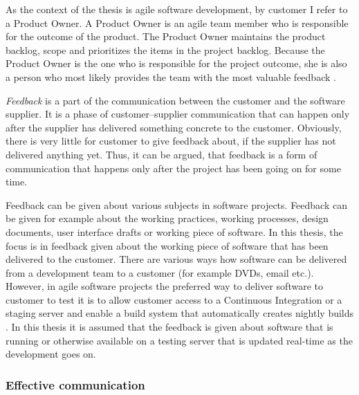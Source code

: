 \documentclass[english,12pt,a4paper,pdftex]{article}
\begin{document}
As the context of the thesis is agile software development, by customer I refer to a Product Owner. A Product Owner is an agile team member who is responsible for the outcome of the product. The Product Owner maintains the product backlog, scope and prioritizes the items in the project backlog. Because the Product Owner is the one who is responsible for the project outcome, she is also a person who most likely provides the team with the most valuable feedback \citep{pichler2010}.

\textit{Feedback} is a part of the communication between the customer and the software supplier. It is a phase of customer--supplier communication that can happen only after the supplier has delivered something concrete to the customer. Obviously, there is very little for customer to give feedback about, if the supplier has not delivered anything yet. Thus, it can be argued, that feedback is a form of communication that happens only after the project has been going on for some time.

Feedback can be given about various subjects in software projects. Feedback can be given for example about the working practices, working processes, design documents, user interface drafts or working piece of software. In this thesis, the focus is in feedback given about the working piece of software that has been delivered to the customer. There are various ways how software can be delivered from a development team to a customer (for example DVDs, email etc.). However, in agile software projects the preferred way to deliver software to customer to test it is to allow customer access to a Continuous Integration or a staging server and enable a build system that automatically creates nightly builds \citep{shore2007} \citep{beck2004}. In this thesis it is assumed that the feedback is given about software that is running or otherwise available on a testing server that is updated real-time as the development goes on.

\subsubsection{Effective communication}

\end{document}
